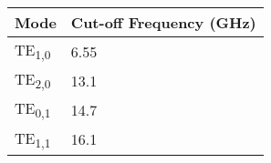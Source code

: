 \begin{longtable}[]{@{}ll@{}}
    \toprule\noalign{}
    Mode & Cut-off Frequency (GHz) \\
    \midrule\noalign{}
    \endhead
    \bottomrule\noalign{}
    \endlastfoot
    TE\textsubscript{1,0} & 6.55 \\
    TE\textsubscript{2,0} & 13.1 \\
    TE\textsubscript{0,1} & 14.7 \\
    TE\textsubscript{1,1} & 16.1 \\
    \end{longtable}